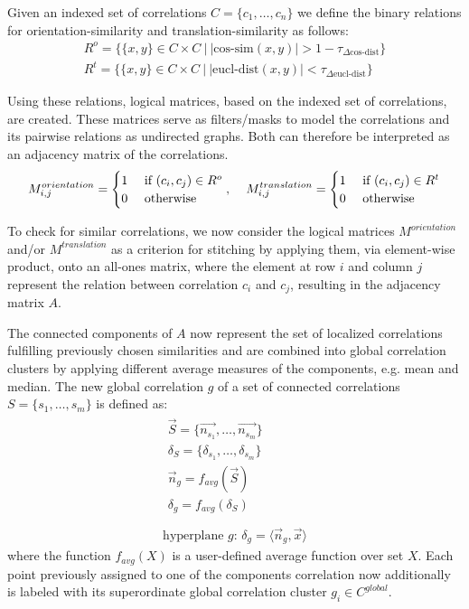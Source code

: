 Given an indexed set of correlations $C=\{c_1,\dotsc,c_n\}$ we define the binary relations for orientation-similarity and translation-similarity as follows:
\begin{align}
    R^{o}=\{\{x,y\} \in C \times C\: \big|\: |\text{cos-sim}(x,y)| > 1-\tau_{\Delta \text{cos-dist}}\}\\
    R^{t}=\{\{x,y\} \in C \times C\: \big|\: |\text{eucl-dist}(x,y)| < \tau_{\Delta \text{eucl-dist}}\}
\end{align}

Using these relations, logical matrices, based on the indexed set of correlations, are created. These matrices serve as filters/masks to model the correlations and its pairwise relations as  undirected graphs. Both can therefore be interpreted as an adjacency matrix of the correlations.
\begin{align}
    M^{orientation}_{i,j} = 
    \begin{cases}
        1 &\text{ if } (c_i,c_j) \in R^o\\
        0 &\text{ otherwise}
    \end{cases}, \textbf{\quad}
    M^{translation}_{i,j} = 
    \begin{cases}
        1 &\text{ if } (c_i,c_j) \in R^t\\
        0 &\text{ otherwise}
    \end{cases}
\end{align}

To check for similar correlations, we now consider the logical matrices $M^{orientation}$ and/or $M^{translation}$ as a criterion for stitching by applying them, via element-wise product, onto an all-ones matrix, where the element at row $i$ and column $j$ represent the relation between correlation $c_i$ and $c_j$, resulting in the adjacency matrix $A$. 

The connected components of $A$ now represent the set of localized correlations fulfilling previously chosen similarities and are combined into global correlation clusters by applying different average measures of the components, e.g. mean and median. The new global correlation $g$ of a set of connected correlations $S=\{s_1,\dotsc, s_m\}$ is defined as:
\begin{gather}
    \begin{split}
        \vec{S} = \{\vec{n_{s_1}},\dotsc,\vec{n_{s_m}}\}\\
        \delta_S = \{\delta_{s_1},\dotsc,\delta_{s_m}\}\\
        \vec{n}_g = f_{avg}(\vec{S})\\
        \delta_g = f_{avg}(\delta_S)
    \end{split}\\
    \nonumber\\
    \text{hyperplane $g$: } \delta_g = \langle \vec{n}_g, \vec{x}\rangle
\end{gather}
where the function $f_{avg}(X)$ is a user-defined average function over set $X$. Each point previously assigned to one of the components correlation now additionally is labeled with its superordinate global correlation cluster $g_i \in C^{global}$.

